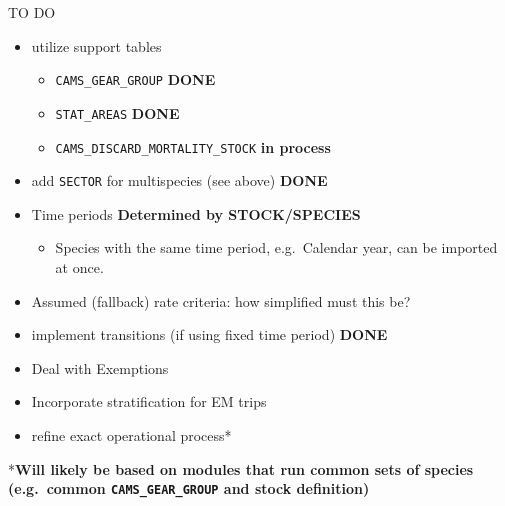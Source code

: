 \documentclass[
  ignorenonframetext,
]{beamer}
\providecommand{\tightlist}{%
  \setlength{\itemsep}{0pt}\setlength{\parskip}{0pt}}
\begin{document}
\begin{frame}[fragile]{TO DO}
\protect\hypertarget{to-do}{}

\begin{itemize}
\tightlist
\item
  utilize support tables

  \begin{itemize}
  \tightlist
  \item
    \texttt{CAMS\_GEAR\_GROUP} \textbf{DONE}
  \item
    \texttt{STAT\_AREAS} \textbf{DONE}
  \item
    \texttt{CAMS\_DISCARD\_MORTALITY\_STOCK} \textbf{in process}
  \end{itemize}
\item
  add \texttt{SECTOR} for multispecies (see above) \textbf{DONE}
\item
  Time periods \textbf{Determined by STOCK/SPECIES}

  \begin{itemize}
  \tightlist
  \item
    Species with the same time period, e.g.~Calendar year, can be
    imported at once.
  \end{itemize}
\item
  Assumed (fallback) rate criteria: how simplified must this be?
\item
  implement transitions (if using fixed time period) \textbf{DONE}
\item
  Deal with Exemptions
\item
  Incorporate stratification for EM trips
\item
  refine exact operational process*
\end{itemize}

*\textbf{Will likely be based on modules that run common sets of species
(e.g.~common \texttt{CAMS\_GEAR\_GROUP} and stock definition)}

\end{frame}
\end{document}
